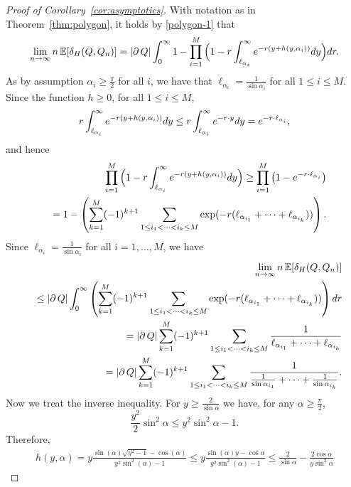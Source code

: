 \documentclass[a4paper,12pt]{article}
\theoremstyle{definition}
\newcommand{\IE}{\mathbb{E}}
\newcommand{\dd}{{\rm d}}
\begin{document}
\begin{proof}[Proof of Corollary~\ref{cor:asymptotics}]
	With notation as in Theorem~\ref{thm:polygon}, it holds by \eqref{polygon-1} that
\begin{eqnarray*}
\lim_{n\to\infty}n \, \IE[\delta_H(Q,Q_n)]
	= \left| \partial \, Q \right| \int_{0}^{\infty}1-\prod_{i=1}^M\Big(1-r\int_{\ell_{\alpha_i}}^{\infty}e^{-r(y+h(y,\alpha_i))}\dd y\Big)\dd r.
\end{eqnarray*}
As by assumption $\alpha_i\ge \frac{\pi}{2}$ for all $i$, we have that  $\ell_{\alpha_i}=\frac{1}{\sin \alpha_i}$ for all $1\leq i\leq M$. Since the function $h \geq 0$, for all $1\leq i \leq M$,
$$
	r\int_{\ell_{\alpha_i}}^{\infty}e^{-r(y+h(y,\alpha_i))}\dd y
	\leq r\int_{\ell_{\alpha_i}}^{\infty}e^{-r\cdot y}\dd y
	=e^{-r\cdot \ell_{\alpha_i}},
$$
and hence
\begin{eqnarray*}
&&\prod_{i=1}^M\Big(1-r\int_{\ell_{\alpha_i}}^{\infty}e^{-r(y+h(y,\alpha_i))}\dd y\Big)
\geq \prod_{i=1}^M\big(1-e^{-r\cdot \ell_{\alpha_{i}}}\big)
\\
&&=1-\left(\sum_{k=1}^{M}(-1)^{k+1}\sum_{1\leq i_{1}<\cdots<i_{k}\leq M}
\exp(-r(\ell_{\alpha_{i_{1}}}+\cdots+\ell_{\alpha_{i_{k}}}))
\right).
\end{eqnarray*}
Since $\ell_{\alpha_i}=\frac{1}{\sin \alpha_i}$ for all $i=1,\dots,M$, we have
\begin{eqnarray*}
&&\lim_{n\to\infty}n \, \IE[\delta_H(Q,Q_n)]
\\
&&\leq\left| \partial \, Q \right| \int_{0}^{\infty}
\left(\sum_{k=1}^{M}(-1)^{k+1}\sum_{1\leq i_{1}<\cdots<i_{k}\leq M}
\exp(-r(\ell_{\alpha_{i_{1}}}+\cdots+\ell_{\alpha_{i_{k}}}))
\right)\dd r
\\
&&=\left| \partial \, Q \right| 
\sum_{k=1}^{M}(-1)^{k+1}\sum_{1\leq i_{1}<\cdots<i_{k}\leq M}
\frac{1}{\ell_{\alpha_{i_{1}}}+\cdots+\ell_{\alpha_{i_{k}}}}
\\
&&=\left| \partial \, Q \right|
\sum_{k=1}^{M}(-1)^{k+1}\sum_{1\leq i_{1}<\cdots <i_{k}\leq M}
\frac{1}{\frac{1}{\sin\alpha_{i_{1}}}+\cdots+\frac{1}{\sin\alpha_{i_{k}}}}.
\end{eqnarray*}
Now we treat the inverse inequality. For $y\geq\frac{2}{\sin\alpha}$ we have, for any $\alpha\ge \frac{\pi}{2}$,
$$
\frac{y^2}{2}\sin^{2}\alpha \leq y^2 \sin^{2}\alpha  -1.
$$
Therefore,
\begin{eqnarray*}
h(y,\alpha)
= y\frac{\sin(\alpha)\sqrt{y^2-1}-\cos(\alpha)}{y^2 \sin^2(\alpha)-1}
\leq y\frac{\sin(\alpha)y-\cos\alpha}{y^2 \sin^2(\alpha)-1}
\leq\frac{2}{\sin\alpha}-\frac{2\cos\alpha}{y\sin^{2}\alpha}

\end{eqnarray*}
\end{proof}
\end{document}
